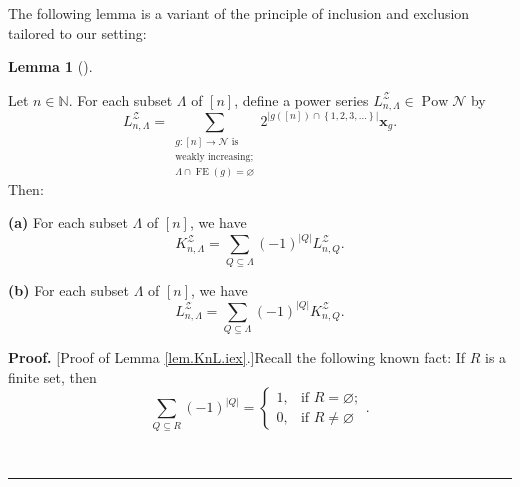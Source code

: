 \documentclass[numbers=enddot,12pt,final,onecolumn,notitlepage]{scrartcl}%
\theoremstyle{definition}
\newtheorem{lem}[theo]{Lemma}
\newenvironment{lemma}[1][]
{\begin{lem}[#1]\begin{leftbar}}
{\end{leftbar}\end{lem}}
\newenvironment{proof}[1][Proof]{\noindent\textbf{#1.} }{\ \rule{0.5em}{0.5em}}
\newenvironment{verlong}{}{}
\let\sumnonlimits\sum
\renewcommand{\sum}{\sumnonlimits\limits}
\begin{document}
\begin{verlong}
The following lemma is a variant of the principle of inclusion and exclusion
tailored to our setting:

\begin{lemma}
\label{lem.KnL.iex}Let $n\in\mathbb{N}$. For each subset $\Lambda$ of $\left[
n\right]  $, define a power series $L_{n,\Lambda}^{\mathcal{Z}}\in
\operatorname*{Pow}\mathcal{N}$ by%
\begin{equation}
L_{n,\Lambda}^{\mathcal{Z}}=\sum_{\substack{g:\left[  n\right]  \rightarrow
\mathcal{N}\text{ is}\\\text{weakly increasing;}\\\Lambda\cap
\operatorname*{FE}\left(  g\right)  =\varnothing}}2^{\left\vert g\left(
\left[  n\right]  \right)  \cap\left\{  1,2,3,\ldots\right\}  \right\vert
}\mathbf{x}_{g}. \label{eq.lem.KnL.iex.defL}%
\end{equation}
Then:

\textbf{(a)} For each subset $\Lambda$ of $\left[  n\right]  $, we have%
\[
K_{n,\Lambda}^{\mathcal{Z}}=\sum_{Q\subseteq\Lambda}\left(  -1\right)
^{\left\vert Q\right\vert }L_{n,Q}^{\mathcal{Z}}.
\]


\textbf{(b)} For each subset $\Lambda$ of $\left[  n\right]  $, we have%
\[
L_{n,\Lambda}^{\mathcal{Z}}=\sum_{Q\subseteq\Lambda}\left(  -1\right)
^{\left\vert Q\right\vert }K_{n,Q}^{\mathcal{Z}}.
\]

\end{lemma}

\begin{proof}
[Proof of Lemma \ref{lem.KnL.iex}.]Recall the following known fact: If $R$ is
a finite set, then%
\begin{equation}
\sum_{Q\subseteq R}\left(  -1\right)  ^{\left\vert Q\right\vert }=%
\begin{cases}
1, & \text{if }R=\varnothing;\\
0, & \text{if }R\neq\varnothing
\end{cases}
. \label{pf.lem.KnL.iex.1}%
\end{equation}



\end{proof}
\end{verlong}
\end{document}

